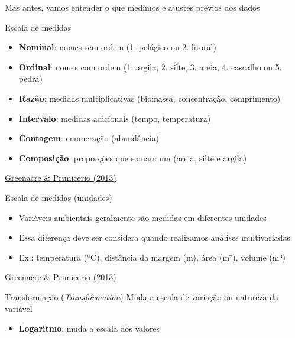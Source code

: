 \documentclass[
  ignorenonframetext,
]{beamer}
\providecommand{\tightlist}{%
  \setlength{\itemsep}{0pt}\setlength{\parskip}{0pt}}\usepackage{longtable,booktabs,array}
\begin{document}
\begin{frame}{Mas antes, vamos entender o que medimos e ajustes prévios
dos dados}
\protect\hypertarget{mas-antes-vamos-entender-o-que-medimos-e-ajustes-pruxe9vios-dos-dados}{}
\begin{block}{Escala de medidas}
\protect\hypertarget{escala-de-medidas}{}
\begin{itemize}
\tightlist
\item
  \textbf{Nominal}: nomes sem ordem (1. pelágico ou 2. litoral)
\item
  \textbf{Ordinal}: nomes com ordem (1. argila, 2. silte, 3. areia, 4.
  cascalho ou 5. pedra)
\item
  \textbf{Razão}: medidas multiplicativas (biomassa, concentração,
  comprimento)
\item
  \textbf{Intervalo}: medidas adicionais (tempo, temperatura)
\item
  \textbf{Contagem}: enumeração (abundância)
\item
  \textbf{Composição}: proporções que somam um (areia, silte e argila)
\end{itemize}

\href{https://www.fbbva.es/microsite/multivariate-statistics/}{Greenacre
\& Primicerio (2013)}
\end{block}

\begin{block}{Escala de medidas (unidades)}
\protect\hypertarget{escala-de-medidas-unidades}{}
\begin{itemize}
\item
  Variáveis ambientais geralmente são medidas em diferentes unidades
\item
  Essa diferença deve ser considera quando realizamos análises
  multivariadas
\item
  Ex.: temperatura (ºC), distância da margem (m), área (m²), volume (m³)
\end{itemize}

\href{https://www.fbbva.es/microsite/multivariate-statistics/}{Greenacre
\& Primicerio (2013)}
\end{block}

\begin{block}{Transformação (\emph{Transformation})}
\protect\hypertarget{transformauxe7uxe3o-transformation}{}
Muda a escala de variação ou natureza da variável

\begin{itemize}
\tightlist
\item
  \textbf{Logaritmo}: muda a escala dos valores
\end{itemize}


\end{block}
\end{frame}
\end{document}
